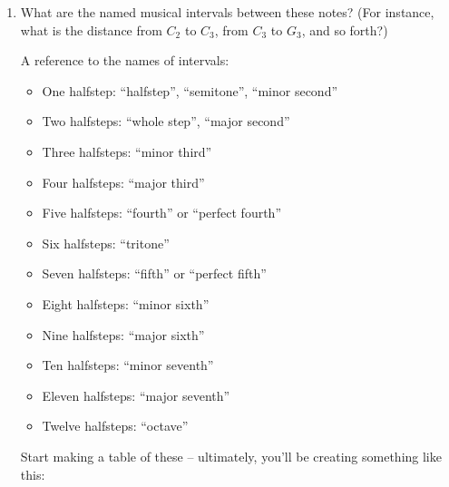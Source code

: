 \documentclass[12pt]{article}
\newcommand{\BI}{\begin{itemize}}
\newcommand{\EI}{\end{itemize}}
\begin{document}
    \begin{enumerate}
      \item What are the named musical intervals between these notes? (For instance, what is the distance from $C_2$ to $C_3$, from $C_3$ to $G_3$, and so forth?)

	A reference to the names of intervals:

	\BI
      \item One halfstep: ``halfstep'', ``semitone'', ``minor second''
      \item Two halfsteps: ``whole step'', ``major second''
      \item Three halfsteps: ``minor third''
      \item Four halfsteps: ``major third''
      \item Five halfsteps: ``fourth'' or ``perfect fourth''
      \item Six halfsteps: ``tritone''
      \item Seven halfsteps: ``fifth'' or ``perfect fifth''
      \item Eight halfsteps: ``minor sixth''
      \item Nine halfsteps: ``major sixth''
      \item Ten halfsteps: ``minor seventh''
      \item Eleven halfsteps: ``major seventh''
      \item Twelve halfsteps: ``octave''
	\EI

	Start making a table of these -- ultimately, you'll be creating something like this:


\end{enumerate}
\end{document}
